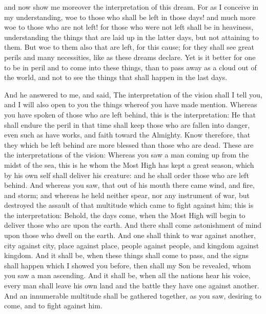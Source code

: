 {and now show me moreover the interpretation of this dream.
For as I conceive in my understanding, woe to those who shall be left in those days! and much more woe to those who are not left!
for those who were not left shall be in heaviness,
understanding the things that are laid up in the latter days, but not attaining to them.
But woe to them also that are left, for this cause; for they shall see great perils and many necessities, like as these dreams declare.
Yet is it
 better for one to be in peril and to come into
 these things, than to pass away as a cloud out of the world, and not to see the things that
 shall happen in the last days.
\par }{\PP And he answered to me, and said,
The interpretation of the vision shall I tell you, and I will also open to you the things whereof you have made mention.
Whereas you have spoken of those who are left behind, this is the interpretation:
He that shall
 endure the peril in that time shall keep those who are fallen into danger, even such as have works, and faith toward the Almighty.
Know therefore, that they which be left behind are more blessed than those who are dead.
These are the interpretations of the vision: Whereas you saw a man coming up from the midst of the sea,
this is he whom the Most High has kept a great season, which by his own self shall deliver his creature: and he shall order those who are left behind.
And whereas you saw, that out of his mouth there came wind, and fire, and storm;
and whereas he held neither spear, nor any instrument of war, but destroyed the assault of that multitude which came to fight against him; this is the interpretation:
Behold, the days come, when the Most High will begin to deliver those who are upon the earth.
And there shall come astonishment of mind upon those who dwell on the earth.
And one shall think to war against another, city against city, place against place, people against people, and kingdom against kingdom.
And it shall be, when these things shall come to pass, and the signs shall happen which I showed you before, then shall my Son be revealed, whom you saw
{} a man ascending.
And it shall be, when all the nations hear his voice, every man shall leave his own land and the battle they have one against another.
And an innumerable multitude shall be gathered together, as you saw, desiring to come, and to fight against him.
}
